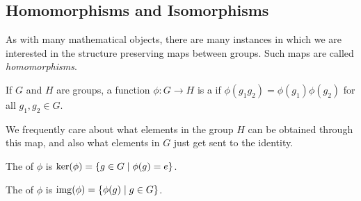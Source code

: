 \documentclass[a4paper]{scrartcl}
\begin{document}




\subsection{Homomorphisms and Isomorphisms}

As with many mathematical objects, there are many instances in which we are interested in the structure preserving maps between groups. Such maps are called 
\emph{homomorphisms}.

\begin{definition}[Homomorphism]
  If $G$ and $H$ are groups, a function $\phi: G \rightarrow H$ is a  if
  $
  \phi(g_1 g_2) = \phi(g_1) \phi(g_2)
  $
  for all $g_1, g_2 \in G$.
\end{definition}

We frequently care about what elements in the group $H$ can be obtained through this map, and also what elements in $G$ just get sent to the identity. 

\begin{definition}[Kernel]
	The  of $\phi$ is $\operatorname{ker}(\phi) = \{ g \in G \mid \phi(g) = e\}$.
\end{definition}
\begin{definition}[Image]
	The  of $\phi$ is $\operatorname{img}(\phi) = \{ \phi(g) \mid g \in G\}$. 
\end{definition}
\end{document}
